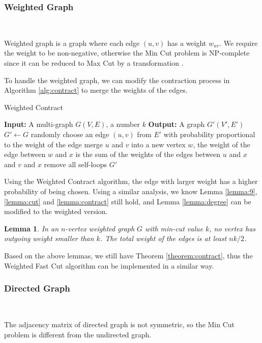 \documentclass[12pt]{article}
\newtheorem{lemma}{Lemma}
\begin{document}
\subsubsection{Weighted Graph}\

Weighted graph is a graph where each edge $(u,v)$ has a weight $w_{uv}$. We require the weight to be non-negative, otherwise the Min Cut problem is NP-complete since it can be reduced to Max Cut by a transformation \cite{garey1979computers}.

To handle the weighted graph, we can modify the contraction process in Algorithm \ref{alg:contract} to merge the weights of the edges.
\begin{algorithm}
    \caption{Weighted Contract}
    \label{alg:weightcontract}
    \begin{algorithmic}
        \STATE \textbf{Input:} A multi-graph $G(V,E)$, a number $k$
        \STATE \textbf{Output:} A graph $G'(V',E')$
        \STATE $G'\leftarrow G$
        \STATE randomly choose an edge $(u,v)$ from $E'$ with probability proportional to the weight of the edge
        \STATE merge $u$ and $v$ into a new vertex $w$, the weight of the edge between $w$ and $x$ is the sum of the weights of the edges between $u$ and $x$ and $v$ and $x$
        \STATE remove all self-loops
        \ENDWHILE
        \RETURN $G'$
    \end{algorithmic}
\end{algorithm}

Using the Weighted Contract algorithm, the edge with larger weight has a higher probability of being chosen. Using a similar analysis, we know Lemma \ref{lemma:9}, \ref{lemma:cut} and \ref{lemma:contract} still hold, and Lemma \ref{lemma:degree} can be modified to the weighted version.

\begin{lemma}
    In an $n$-vertex weighted graph $G$ with min-cut value $k$, no vertex has outgoing weight smaller than $k$. The total weight of the edges is at least $nk/2$.
\end{lemma}

Based on the above lemmas, we still have Theorem \ref{theorem:contract}, thus the Weighted Fast Cut algorithm can be implemented in a similar way.

\subsubsection{Directed Graph}\

The adjacency matrix of directed graph is not symmetric, so the Min Cut problem is different from the undirected graph.
\end{document}
